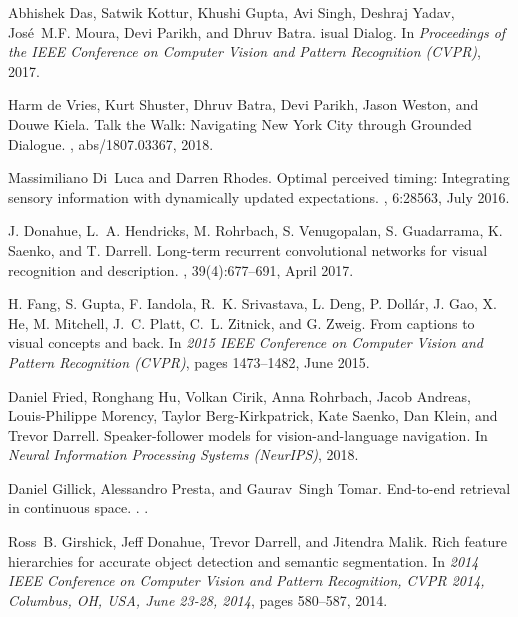 \documentclass[10pt,twocolumn,letterpaper]{article}
\begin{document}
\begin{thebibliography}{10}
Abhishek Das, Satwik Kottur, Khushi Gupta, Avi Singh, Deshraj Yadav,
  Jos\'e~M.F. Moura, Devi Parikh, and Dhruv Batra.
isual {D}ialog.
\newblock In {\em Proceedings of the IEEE Conference on Computer Vision and
  Pattern Recognition (CVPR)}, 2017.

Harm de Vries, Kurt Shuster, Dhruv Batra, Devi Parikh, Jason Weston, and Douwe
  Kiela.
\newblock Talk the {W}alk: Navigating {N}ew {Y}ork {C}ity through {G}rounded
  {D}ialogue.
, abs/1807.03367, 2018.

Massimiliano Di~Luca and Darren Rhodes.
\newblock Optimal perceived timing: Integrating sensory information with
  dynamically updated expectations.
, 6:28563, July 2016.

J. {Donahue}, L.~A. {Hendricks}, M. {Rohrbach}, S. {Venugopalan}, S.
  {Guadarrama}, K. {Saenko}, and T. {Darrell}.
\newblock Long-term recurrent convolutional networks for visual recognition and
  description.
,
  39(4):677--691, April 2017.

H. {Fang}, S. {Gupta}, F. {Iandola}, R.~K. {Srivastava}, L. {Deng}, P.
  {Dollár}, J. {Gao}, X. {He}, M. {Mitchell}, J.~C. {Platt}, C.~L. {Zitnick},
  and G. {Zweig}.
\newblock From captions to visual concepts and back.
\newblock In {\em 2015 IEEE Conference on Computer Vision and Pattern
  Recognition (CVPR)}, pages 1473--1482, June 2015.

Daniel Fried, Ronghang Hu, Volkan Cirik, Anna Rohrbach, Jacob Andreas,
  Louis-Philippe Morency, Taylor Berg-Kirkpatrick, Kate Saenko, Dan Klein, and
  Trevor Darrell.
\newblock Speaker-follower models for vision-and-language navigation.
\newblock In {\em Neural Information Processing Systems (NeurIPS)}, 2018.

Daniel Gillick, Alessandro Presta, and Gaurav~Singh Tomar.
\newblock End-to-end retrieval in continuous space.
.
.

Ross~B. Girshick, Jeff Donahue, Trevor Darrell, and Jitendra Malik.
\newblock Rich feature hierarchies for accurate object detection and semantic
  segmentation.
\newblock In {\em 2014 {IEEE} Conference on Computer Vision and Pattern
  Recognition, {CVPR} 2014, Columbus, OH, USA, June 23-28, 2014}, pages
  580--587, 2014.


\end{thebibliography}
\end{document}
